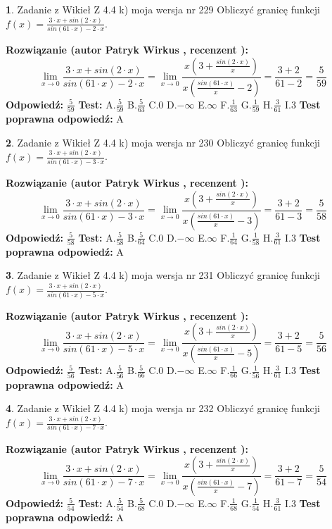\documentclass[12pt, a4paper]{article}
\theoremstyle{definition} %
\newtheorem{zad}{}
\newcommand{\zadStart}[1]{\begin{zad}#1\newline}
\newcommand{\zadStop}{\end{zad}}
\newcommand{\rozwStart}[2]{\noindent \textbf{Rozwiązanie (autor #1 , recenzent #2): }\newline}
\newcommand{\rozwStop}{\newline}
\newcommand{\odpStart}{\noindent \textbf{Odpowiedź:}\newline}
\newcommand{\odpStop}{\newline}
\newcommand{\testStart}{\noindent \textbf{Test:}\newline}
\newcommand{\testStop}{\newline}
\newcommand{\kluczStart}{\noindent \textbf{Test poprawna odpowiedź:}\newline}
\newcommand{\kluczStop}{\newline}
\begin{document}
\zadStart{Zadanie z Wikieł Z 4.4 k) moja wersja nr 229}
Obliczyć granicę funkcji $f(x)=\frac{3\cdot x +sin(2\cdot x)}{sin(61\cdot x) -2\cdot x}$.
\zadStop
\rozwStart{Patryk Wirkus}{}
$$\lim\limits_{x\to 0}\frac{3\cdot x +sin(2\cdot x)}{sin(61\cdot x) -2\cdot x}
=\lim\limits_{x\to 0}\frac{x(3+\frac{sin(2\cdot x)}{x})}{x(\frac{sin(61\cdot x)}{x}-2)}
=\frac{3+2}{61-2} = \frac{5}{59}$$
\rozwStop
\odpStart
$\frac{5}{59}$
\odpStop
\testStart
A.$\frac{5}{59}$
B.$\frac{5}{63}$
C.$0$
D.$-\infty$
E.$\infty$
F.$\frac{1}{63}$
G.$\frac{1}{59}$
H.$\frac{3}{61}$
I.$3$
\testStop
\kluczStart
A
\kluczStop



\zadStart{Zadanie z Wikieł Z 4.4 k) moja wersja nr 230}
Obliczyć granicę funkcji $f(x)=\frac{3\cdot x +sin(2\cdot x)}{sin(61\cdot x) -3\cdot x}$.
\zadStop
\rozwStart{Patryk Wirkus}{}
$$\lim\limits_{x\to 0}\frac{3\cdot x +sin(2\cdot x)}{sin(61\cdot x) -3\cdot x}
=\lim\limits_{x\to 0}\frac{x(3+\frac{sin(2\cdot x)}{x})}{x(\frac{sin(61\cdot x)}{x}-3)}
=\frac{3+2}{61-3} = \frac{5}{58}$$
\rozwStop
\odpStart
$\frac{5}{58}$
\odpStop
\testStart
A.$\frac{5}{58}$
B.$\frac{5}{64}$
C.$0$
D.$-\infty$
E.$\infty$
F.$\frac{1}{64}$
G.$\frac{1}{58}$
H.$\frac{3}{61}$
I.$3$
\testStop
\kluczStart
A
\kluczStop



\zadStart{Zadanie z Wikieł Z 4.4 k) moja wersja nr 231}
Obliczyć granicę funkcji $f(x)=\frac{3\cdot x +sin(2\cdot x)}{sin(61\cdot x) -5\cdot x}$.
\zadStop
\rozwStart{Patryk Wirkus}{}
$$\lim\limits_{x\to 0}\frac{3\cdot x +sin(2\cdot x)}{sin(61\cdot x) -5\cdot x}
=\lim\limits_{x\to 0}\frac{x(3+\frac{sin(2\cdot x)}{x})}{x(\frac{sin(61\cdot x)}{x}-5)}
=\frac{3+2}{61-5} = \frac{5}{56}$$
\rozwStop
\odpStart
$\frac{5}{56}$
\odpStop
\testStart
A.$\frac{5}{56}$
B.$\frac{5}{66}$
C.$0$
D.$-\infty$
E.$\infty$
F.$\frac{1}{66}$
G.$\frac{1}{56}$
H.$\frac{3}{61}$
I.$3$
\testStop
\kluczStart
A
\kluczStop



\zadStart{Zadanie z Wikieł Z 4.4 k) moja wersja nr 232}
Obliczyć granicę funkcji $f(x)=\frac{3\cdot x +sin(2\cdot x)}{sin(61\cdot x) -7\cdot x}$.
\zadStop
\rozwStart{Patryk Wirkus}{}
$$\lim\limits_{x\to 0}\frac{3\cdot x +sin(2\cdot x)}{sin(61\cdot x) -7\cdot x}
=\lim\limits_{x\to 0}\frac{x(3+\frac{sin(2\cdot x)}{x})}{x(\frac{sin(61\cdot x)}{x}-7)}
=\frac{3+2}{61-7} = \frac{5}{54}$$
\rozwStop
\odpStart
$\frac{5}{54}$
\odpStop
\testStart
A.$\frac{5}{54}$
B.$\frac{5}{68}$
C.$0$
D.$-\infty$
E.$\infty$
F.$\frac{1}{68}$
G.$\frac{1}{54}$
H.$\frac{3}{61}$
I.$3$
\testStop
\kluczStart
A
\kluczStop
\end{document}
